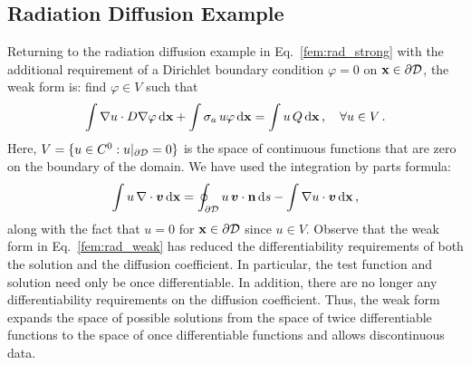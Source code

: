 \documentclass[../doc.tex]{subfiles}
\begin{document}
\subsection{Radiation Diffusion Example} \label{fem_sec:rad_diff}
Returning to the radiation diffusion example in Eq.~\ref{fem:rad_strong} with the additional requirement of a Dirichlet boundary condition $\varphi = 0$ on $\boldsymbol{\mathrm{x}}\in\partial\mathcal{D}$, the weak form is: find $\varphi \in V$ such that 
	\begin{equation} \label{fem:rad_weak}
		\int \nabla u \cdot D \nabla\varphi \mathop{}\!\mathrm{d} \boldsymbol{\mathrm{x}} + \int \sigma_a\, u \varphi \mathop{}\!\mathrm{d} \boldsymbol{\mathrm{x}} = \int u\, Q \mathop{}\!\mathrm{d} \boldsymbol{\mathrm{x}} \,,\quad \forall u \in V \,. 
	\end{equation}
Here, $V = \{ u \in C^0 : u|_{\partial\mathcal{D}} = 0 \}$ is the space of continuous functions that are zero on the boundary of the domain. 
We have used the integration by parts formula: 
	\begin{equation}
		\int u\, \nabla\cdot\boldsymbol{v} \mathop{}\!\mathrm{d} \boldsymbol{\mathrm{x}} = \oint_{\partial\mathcal{D}} u\,\boldsymbol{v}\cdot\boldsymbol{\mathrm{n}} \mathop{}\!\mathrm{d} s - \int \nabla u \cdot \boldsymbol{v} \mathop{}\!\mathrm{d} \boldsymbol{\mathrm{x}} \,, 
	\end{equation}
along with the fact that $u = 0$ for $\boldsymbol{\mathrm{x}} \in \partial\mathcal{D}$ since $u \in V$.  
Observe that the weak form in Eq.~\ref{fem:rad_weak} has reduced the differentiability requirements of both the solution and the diffusion coefficient. In particular, the test function and solution need only be once differentiable. In addition, there are no longer any differentiability requirements on the diffusion coefficient. 
Thus, the weak form expands the space of possible solutions from the space of twice differentiable functions to the space of once differentiable functions and allows discontinuous data. 
\end{document}
